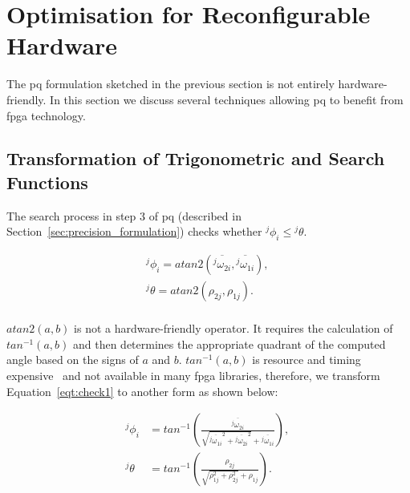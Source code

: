 \section{Optimisation for Reconfigurable Hardware}
\label{sec:precision_optimisation}

The \gls{pq} formulation sketched in the previous section is not entirely hardware-friendly.
In this section we discuss several techniques allowing \gls{pq} to benefit from \gls{fpga} technology.

\subsection{Transformation of Trigonometric and Search Functions}
\label{sec:precision_trigo}
The search process in step 3 of \gls{pq} (described in Section~\ref{sec:precision_formulation}) checks whether \linebreak ${^j\phi}_i \le {^j\theta}$.

\begin{equation}
\begin{aligned}
{^j\phi}_i = atan2 \left ( \overline{{^j\omega}_{2i}},\overline{{^j\omega}_{1i}} \right ) \mbox{, } \\
{^j\theta} = atan2 \left ( \rho_{2j},\rho_{1j} \right ) \mbox{.} \\
\end{aligned}
\label{eqt:check1}
\end{equation}

$atan2(a,b)$ is not a hardware-friendly operator.
It requires the calculation of $tan^{-1}(a,b)$ and then determines the appropriate quadrant of the computed angle based on the signs of $a$ and $b$.
$tan^{-1}(a,b)$ is resource and timing expensive~\cite{altera_megafunctions} and not available in many \gls{fpga} libraries, therefore, we transform Equation~\ref{eqt:check1} to another form as shown below:

\begin{equation}
\begin{aligned}
{^j\phi}_i &= tan^{-1} \left ( \frac{\overline{{^j\omega}_{2i}}}{\sqrt{\overline{{^j\omega}_{1i}}^2+\overline{{^j\omega}_{2i}}^2}+\overline{{^j\omega}_{1i}}} \right ) \mbox{, } \\
{^j\theta} &= tan^{-1} \left ( \frac{\rho_{2j}}{\sqrt{\rho_{1j}^2+\rho_{2j}^2}+\rho_{1j}} \right ) \mbox{.}
\end{aligned}
\label{eqt:check2}
\end{equation}

